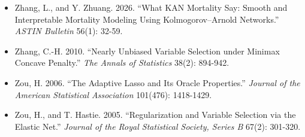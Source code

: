 \documentclass[UTF8, fontset=macnew, a4paper, 12pt]{ctexart}
\begin{document}
\begin{itemize}[leftmargin=2em, label={}, itemsep=3pt]
        Modify the Estimation of Lee--Carter Model for Small Populations.''
        \textit{North American Actuarial Journal}.
        doi:10.1080/10920277.2019.1650288
  \item[] Zhang, L., and Y. Zhuang. 2026. ``What KAN Mortality Say: Smooth and
        Interpretable Mortality Modeling Using Kolmogorov--Arnold Networks.''
        \textit{ASTIN Bulletin} 56(1): 32-59.
  \item[] Zhang, C.-H. 2010. ``Nearly Unbiased Variable Selection under
        Minimax Concave Penalty.'' \textit{The Annals of Statistics}
        38(2): 894-942.
  \item[] Zou, H. 2006. ``The Adaptive Lasso and Its Oracle Properties.''
        \textit{Journal of the American Statistical Association}
        101(476): 1418-1429.
  \item[] Zou, H., and T. Hastie. 2005. ``Regularization and Variable Selection
        via the Elastic Net.'' \textit{Journal of the Royal Statistical
        Society, Series B} 67(2): 301-320.
\end{itemize}
\end{document}
